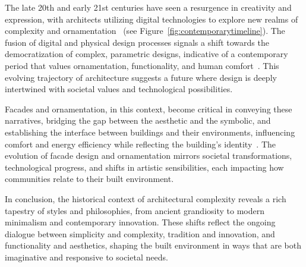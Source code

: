 The late 20th and early 21st centuries have seen a resurgence in creativity and expression, with architects utilizing digital technologies to explore new realms of complexity and ornamentation~\cite{Burlando2019} (see Figure~\ref{fig:contemporarytimeline}).
The fusion of digital and physical design processes signals a shift towards the democratization of complex, parametric designs, indicative of a contemporary period that values ornamentation, functionality, and human comfort~\cite{Kim2019}.
This evolving trajectory of architecture suggests a future where design is deeply intertwined with societal values and technological possibilities.

Facades and ornamentation, in this context, become critical in conveying these narratives, bridging the gap between the aesthetic and the symbolic, and establishing the interface between buildings and their environments, influencing comfort and energy efficiency while reflecting the building's identity~\cite{Kamal2020}.
The evolution of facade design and ornamentation mirrors societal transformations, technological progress, and shifts in artistic sensibilities, each impacting how communities relate to their built environment.

In conclusion, the historical context of architectural complexity reveals a rich tapestry of styles and philosophies, from ancient grandiosity to modern minimalism and contemporary innovation.
These shifts reflect the ongoing dialogue between simplicity and complexity, tradition and innovation, and functionality and aesthetics, shaping the built environment in ways that are both imaginative and responsive to societal needs.

